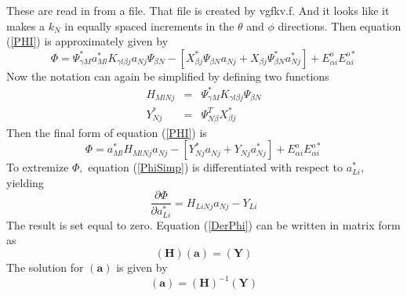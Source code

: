\documentclass{article}
\begin{document}
These are read in from a file. That file is created by vgfkv.f. And it looks
like it makes a $k_{N}$ in equally spaced increments in the $\theta $ and $%
\phi $ directions. Then equation (\ref{PHI}) is
approximately given by 
\begin{equation}
\Phi =\Psi _{\gamma M}^{\ast }a_{Ml}^{\ast }K_{\gamma l\beta j}a_{Nj}\Psi
_{\beta N}-\left[ X_{\beta j}^{\ast }\Psi _{\beta N}a_{Nj}+X_{\beta j}\Psi
_{\beta N}^{\ast }a_{Nj}^{\ast }\right] +E_{\alpha i}^{o}E_{\alpha i}^{o\ast
}
\end{equation}%
Now the notation can again be simplified by defining two functions 
\begin{eqnarray}
H_{MlNj} &=&\Psi _{\gamma M}^{\ast }K_{\gamma l\beta j}\Psi _{\beta N} \\
Y_{Nj}^{\ast } &=&\Psi _{N\beta }^{T}X_{\beta j}^{\ast }
\end{eqnarray}%
Then the final form of equation (\ref{PHI}) is 
\begin{equation}
\Phi =a_{Ml}^{\ast }H_{MlNj}a_{Nj}-\left[ Y_{Nj}^{\ast
}a_{Nj}+Y_{Nj}a_{Nj}^{\ast }\right] +E_{\alpha i}^{o}E_{\alpha i}^{o\ast }
\label{PhiSimp}
\end{equation}%
To extremize $\Phi ,$ equation (\ref{PhiSimp}) is differentiated with
respect to $a_{Li}^{\ast },$ yielding 
\begin{equation}
\frac{\partial \Phi }{\partial a_{Li}^{\ast }}=H_{LiNj}a_{Nj}-Y_{Li}
\label{DerPhi}
\end{equation}%
The result is set equal to zero. Equation (\ref{DerPhi}) can be written in
matrix form as 
\begin{equation}
\left( \mathbf{H}\right) \left( \mathbf{a}\right) =\left( \mathbf{Y}\right)
\label{HaY}
\end{equation}%
The solution for $\left( \mathbf{a}\right) $ is given by 
\begin{equation}
\left( \mathbf{a}\right) =\left( \mathbf{H}\right) ^{-1}\left( \mathbf{Y}%
\right)  \label{aHY1}
\end{equation}
\end{document}
